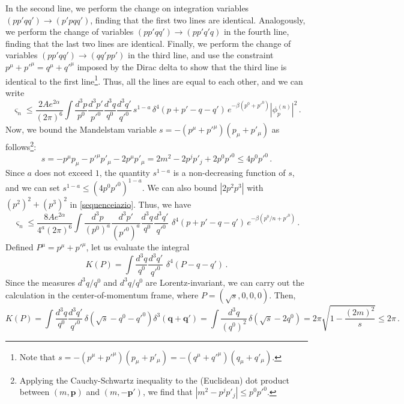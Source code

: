 \documentclass[a4paper, amsfonts, amssymb, amsmath, reprint, showkeys, nofootinbib, twoside, onecolumn,notitlepage,,longbibliography]{revtex4-2}
\theoremstyle{definition}
\theoremstyle{theorem}
\theoremstyle{corollary}
\begin{document}
In the second line, we perform the change on integration variables $(pp'qq')\rightarrow(p'pqq')$, finding that the first two lines are identical. Analogously, we perform the change of variables $(pp'qq')\rightarrow(pp'q'q)$ in the fourth line, finding that the last two lines are identical. Finally, we perform the change of variables $(pp'qq')\rightarrow(qq'pp')$ in the third line, and use the constraint $p^\mu+p'^\mu=q^\mu +q'^\mu$ imposed by the Dirac delta to show that the third line is identical to the first line\footnote{Note that $s=-(p^\mu {+}p'^\mu)(p_\mu {+}p'_\mu)=-(q^\mu {+}q'^\mu)(q_\mu {+}q'_\mu)$.}. Thus, all the lines are equal to each other, and we can write
\begin{equation}
    \varsigma_n \leq  \dfrac{2Ae^{2\alpha}}{(2\pi)^{6}} 
\int \dfrac{d^3p}{ p^0} \dfrac{d^3p'}{p'^0} \dfrac{d^3q}{q^0} \dfrac{d^3q'}{q'^0} \, s^{1-a} \, \delta^4 (p{+}p'{-}q{-}q') \, e^{-\beta(p^0+p'^0)} |\phi_p^{(n)}|^2  \, .
\end{equation}
Now, we bound the Mandelstam variable $s=-(p^\mu {+}p'^\mu)(p_\mu {+}p'_\mu)$ as follows\footnote{Applying the Cauchy-Schwartz inequality to the (Euclidean) dot product between $(m,\textbf{p})$ and $(m,-\textbf{p}')$, we find that $|m^2{-}p^j p'_j |\leq p^0 p'^0$.}:
   \begin{equation}
s=-p^\mu p_\mu -p'^\mu p'_\mu-2p^\mu p'_\mu =2m^2-2 p^j p'_j +2p^0 p'^0 \leq 4 p^0 p'^0 \, .
\end{equation}
Since $a$ does not exceed $1$, the quantity $s^{1-a}$ is a non-decreasing function of $s$, and we can set $s^{1-a}\leq (4 p^0 p'^0)^{1-a}$. We can also bound $|2p^2 p^3|$ with $(p^2)^2{+}(p^3)^2$ in \eqref{sequenceiazio}. Thus, we have
\begin{equation}\label{veganismo2}
\varsigma_n \leq  \dfrac{8 Ae^{2\alpha}}{4^a(2\pi)^{6}} 
\int \dfrac{d^3p}{ (p^0)^a} \dfrac{d^3p'}{(p'^0)^a} \dfrac{d^3q}{q^0} \dfrac{d^3q'}{q'^0} \,   \, \delta^4 (p{+}p'{-}q{-}q') \, e^{-\beta(p^0/n+p'^0)}  \, .  
\end{equation}
Defined $P^\mu =p^\mu +p'^\mu$, let us evaluate the integral
\begin{equation}
    K(P)= \int  \dfrac{d^3q}{q^0} \dfrac{d^3q'}{q'^0} \,   \, \delta^4 (P{-}q{-}q')  \, .
\end{equation}
Since the measures $d^3 q/q^0$ and $d^3 q/q^0$ are Lorentz-invariant, we can carry out the calculation in the center-of-momentum frame, where $P=(\sqrt{s},0,0,0)$. Then,
\begin{equation}
    K(P)= \int \dfrac{d^3q}{q^0} \dfrac{d^3q'}{q'^0} \,    \delta (\sqrt{s}{-}q^0{-}q'^0) \delta^3 (\textbf{q}+\textbf{q}') = \int  \dfrac{d^3q}{(q^0)^2}  \,    \delta (\sqrt{s}{-}2q^0) = 2\pi \sqrt{1-\dfrac{(2m)^2}{s}} \leq 2\pi \, .
\end{equation}
\end{document}

